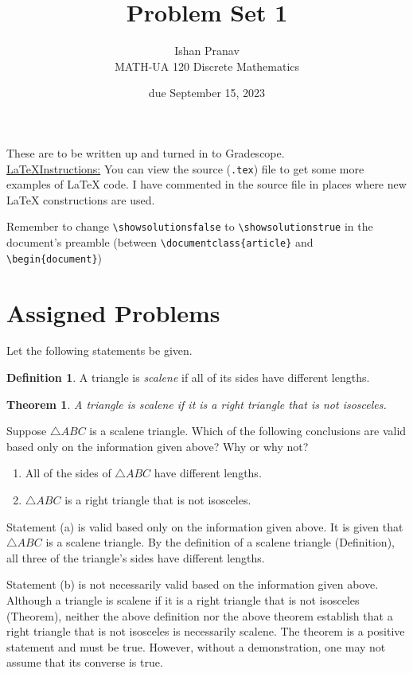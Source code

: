\documentclass{article}
\title{Problem Set 1}
\author{%
    Ishan Pranav
\\  MATH-UA 120 Discrete Mathematics
}
\date{due September 15, 2023}
\newif\ifshowsolutions
\newcommand{\danger}{\marginpar[\hfill\dbend]{\dbend\hfill}}
\newtheorem*{theorem}{Theorem}
\theoremstyle{definition}
\newtheorem*{definition}{Definition}
\begin{document}
\maketitle
These are to be written up and turned in to Gradescope.\\
\ifshowsolutions
    \SetupExSheets{solution/print=true}
\else
    \danger
 \underline{ \LaTeX  Instructions:}  You can view the source (\texttt{.tex}) file to get some more examples of \LaTeX{} code.  I have commented in the source file in places where new \LaTeX{} constructions are used.
  
  Remember to change \verb|\showsolutionsfalse| to \verb|\showsolutionstrue|
    in the document's preamble 
    (between \verb|\documentclass{article}| and \verb|\begin{document}|)
\fi
\section*{Assigned Problems}
\begin{question}
    Let the following statements be given. 
       \begin{definition}
          A triangle is \emph{scalene} if all of its sides have different lengths.
       \end{definition}
       \begin{theorem}
          A triangle is scalene if it is a right triangle that is not isosceles.
       \end{theorem}
    Suppose $\triangle ABC$ is a scalene triangle. 
    Which of the following conclusions are valid based only on the information given above? 
    Why or why not?
    \begin{enumerate}
        \item All of the sides of $\triangle ABC$ have different lengths.
        \item $\triangle ABC$ is a right triangle that is not isosceles.
    \end{enumerate}
\end{question}
\begin{solution}
Statement (a) is valid based only on the information given above. It is given that $\triangle ABC$ is a scalene triangle. By the definition of a scalene triangle (Definition), all three of the triangle's sides have different lengths.

Statement (b) is not necessarily valid based on the information given above. Although a triangle is scalene if it is a right triangle that is not isosceles (Theorem), neither the above definition nor the above theorem establish that a right triangle that is not isosceles is necessarily scalene. The theorem is a positive statement and must be true. However, without a demonstration, one may not assume that its converse is true.
\end{solution}
\end{document}
